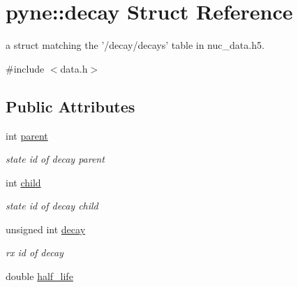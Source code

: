 \hypertarget{structpyne_1_1decay}{\section{pyne\+:\+:decay Struct Reference}
\label{structpyne_1_1decay}
}


a struct matching the '/decay/decays' table in nuc\+\_\+data.\+h5.  




{\ttfamily \#include $<$data.\+h$>$}

\subsection*{Public Attributes}
\begin{DoxyCompactItemize}
\item 
\hypertarget{structpyne_1_1decay_a49696dc372feeb09800f96d6733367f2}{int \hyperlink{structpyne_1_1decay_a49696dc372feeb09800f96d6733367f2}{parent}}\label{structpyne_1_1decay_a49696dc372feeb09800f96d6733367f2}

\begin{DoxyCompactList}\small\item\em state id of decay parent \end{DoxyCompactList}\item 
\hypertarget{structpyne_1_1decay_a945a2d85e13b6457072dcbc3f53b1d68}{int \hyperlink{structpyne_1_1decay_a945a2d85e13b6457072dcbc3f53b1d68}{child}}\label{structpyne_1_1decay_a945a2d85e13b6457072dcbc3f53b1d68}

\begin{DoxyCompactList}\small\item\em state id of decay child \end{DoxyCompactList}\item 
\hypertarget{structpyne_1_1decay_acd08ac0848d8491d1320fe538f0ed35e}{unsigned int \hyperlink{structpyne_1_1decay_acd08ac0848d8491d1320fe538f0ed35e}{decay}}\label{structpyne_1_1decay_acd08ac0848d8491d1320fe538f0ed35e}

\begin{DoxyCompactList}\small\item\em rx id of decay \end{DoxyCompactList}\item 
\hypertarget{structpyne_1_1decay_aff2afc2b50e4e53eb60a67d2448cb889}{double \hyperlink{structpyne_1_1decay_aff2afc2b50e4e53eb60a67d2448cb889}{half\+\_\+life}}\label{structpyne_1_1decay_aff2afc2b50e4e53eb60a67d2448cb889}


\end{DoxyCompactItemize}
